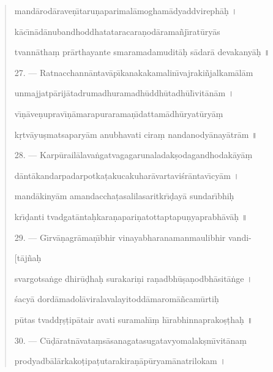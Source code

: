 \documentclass[a4paper, 11pt, oneside, french]{article}
\begin{document}
\begin{quotation}
mand\={a}rod\={a}rave\d{n}\={\i}taru\d{n}aparimal\={a}mogham\={a}dyaddvireph\={a}\d{h} \texthindi{।}

k\={a}c\={\i}n\={a}d\={a}nubandhoddhatataracara\d{n}od\={a}rama\~{n}j\={\i}rat\={u}ry\={a}s

tvann\={a}tha\d{m} pr\={a}rthayante smaramadamudit\={a}\d{h} s\={a}dar\={a} devakany\={a}\d{h} \texthindi{॥}

\bigskip

27. --- Ratnacchann\={a}ntav\={a}p\={\i}kanakakamalin\={\i}vajraki\~{n}jalkam\={a}l\={a}m

unmajjatp\={a}rij\={a}tadrumadhuramadh\={u}ddh\={u}tadh\={u}l\={\i}vit\={a}n\={a}m \texthindi{।}

v\={\i}\d{n}\={a}ve\d{n}uprav\={\i}\d{n}\={a}marapurarama\d{n}\={\i}dattam\={a}dh\={u}ryat\={u}ry\={a}\d{m}

k\d{r}tv\={a}yu\d{s}matsapary\={a}m anubhavati cira\d{m} nandanody\={a}nay\={a}tr\={a}m \texthindi{॥}

\bigskip

28. --- Karp\={u}rail\={a}lava\.{n}gatvagagarunaladak\d{s}odagandhodak\={a}y\={a}\d{m}

d\={a}nt\={a}kandarpadarpotka\d{t}akucakuhar\={a}vartavi\'{s}r\={a}ntav\={\i}cy\={a}m \texthindi{।}

mand\={a}kiny\={a}m amandaccha\d{t}asalilasaritkr\={\i}\d{d}ay\={a} sundar\={\i}bhi\d{h}

kr\={\i}\d{d}anti tvadgat\={a}nta\d{h}kara\d{n}apari\d{n}atottaptapu\d{n}yaprabh\={a}v\={a}\d{h} \texthindi{॥}

\bigskip

29. --- G\={\i}rv\={a}\d{n}agr\={a}ma\d{n}\={\i}bhir vinayabharanamanmaulibhir vandi-

\hspace*{85mm}[t\={a}j\~{n}a\d{h}

svargotsa\.{n}ge dhir\={u}\d{d}ha\d{h} surakari\d{n}i ra\d{n}adbh\={u}\d{s}a\d{n}odbh\={a}sit\={a}\.{n}ge \texthindi{।}

\'{s}acy\={a} dord\={a}madol\={a}viralavalayitodd\={a}marom\={a}\~{n}cam\={u}rti\d{h}

p\={u}tas tvadd\d{r}\d{s}\d{t}ip\={a}tair avati suramah\={\i}\d{m} h\={\i}rabhinnaprako\d{s}\d{t}ha\d{h} \texthindi{॥}

\bigskip

30. --- C\={u}\d{d}\={a}ratn\={a}vata\d{m}s\={a}sanagatasugatavyomalak\d{s}m\={\i}vit\={a}na\d{m}

prodyadb\={a}l\={a}rkako\d{t}ipa\d{t}utarakira\d{n}\={a}p\={u}ryam\={a}natrilokam \texthindi{।}


\end{quotation}
\end{document}
